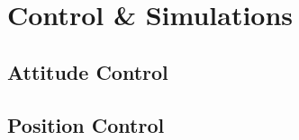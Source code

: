 \chapter{Control \& Simulations}
\label{ch:ch5}
\section{Attitude Control}
\label{sec:ch5.attitude}
\section{Position Control}
\label{sec:ch5.position}
